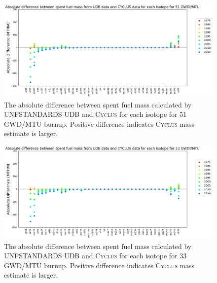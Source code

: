 \documentclass{article}
\newcommand{\Cyclus}{\textsc{Cyclus}\xspace}%
\begin{document}
\begin{figure}[htb] %
    \centering
        \includegraphics[height=0.30\textheight]{absolute_diff_all_51}
        \caption{The absolute difference between spent fuel mass calculated by 
        \gls{UNFSTANDARDS} \gls{UDB} and \Cyclus for each isotope for 51 GWD/MTU burnup. Positive difference indicates \Cyclus mass estimate is larger.}
    \label{fig:absolute_diff_all_51}
\end{figure}

\begin{figure}[htb] %
        \includegraphics[height=0.30\textheight]{absolute_diff_all_33}
        \caption{The absolute difference between spent fuel mass calculated by \gls{UNFSTANDARDS} \gls{UDB} and \Cyclus for each isotope for 33 GWD/MTU burnup. Positive difference indicates \Cyclus mass estimate is larger.}
        \label{fig:absolute}
\end{figure}



\FloatBarrier


\end{document}
